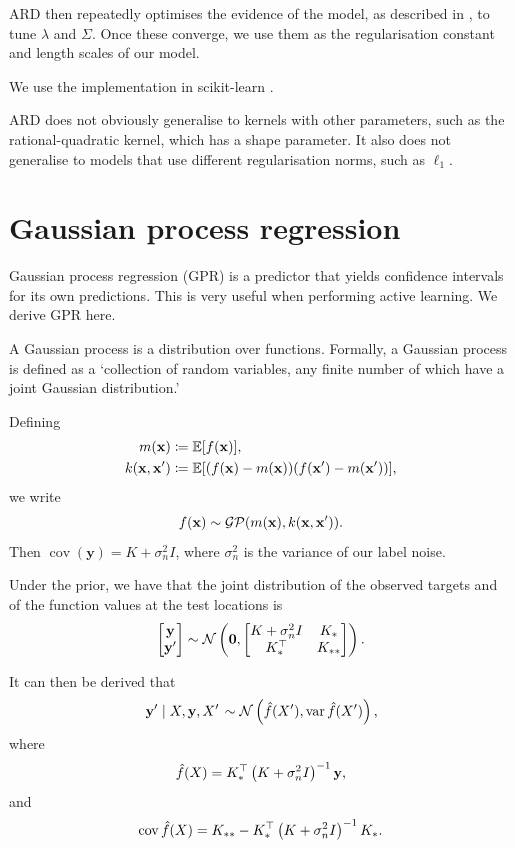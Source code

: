 \documentclass[11pt,twoside,openright]{report}
\newcommand\bbE{\mathbb{E}}
\newcommand\bx{\mathbf{x}}
\newcommand\by{\mathbf{y}}
\newcommand\cG{\mathcal{G}}
\newcommand\cN{\mathcal{N}}
\newcommand\cP{\mathcal{P}}
\DeclareMathOperator{\var}{var}
\DeclareMathOperator{\cov}{cov}
\begin{document}
ARD then repeatedly optimises the evidence of the model, as described in \citep{ARD}, to tune $\lambda$ and $\Sigma$. Once these converge, we use them as the regularisation constant and length scales of our model.

We use the implementation in scikit-learn \citep{Sklearn}.

ARD does not obviously generalise to kernels with other parameters, such as the rational-quadratic kernel, which has a shape parameter. It also does not generalise to models that use different regularisation norms, such as $\ell_1$.

\section{Gaussian process regression}
Gaussian process regression (GPR) is a predictor that yields confidence intervals for its own predictions. This is very useful when performing active learning. We derive GPR here.

A Gaussian process is a distribution over functions. Formally, a Gaussian process is defined as a `collection of random variables, any finite number of which have a joint Gaussian distribution.'\citep{GPBook}

Defining \begin{align*}
    m(\bx) &\coloneqq \bbE[f(\bx)] \text, \\
    k(\bx, \bx') &\coloneqq \bbE[(f(\bx) - m(\bx))(f(\bx') - m(\bx'))],
\end{align*} we write \[
    f(\bx) \sim \cG\cP(m(\bx), k(\bx, \bx'))\text.
\] Then $\cov(\by) = K + \sigma_n^2 I$, where $\sigma_n^2$ is the variance of our label noise.

Under the prior, we have that the joint distribution of the observed targets and of the function values at the test locations is \[
    \begin{bmatrix}
        \by \\ \by'
    \end{bmatrix} \sim \cN\left(\mathbf{0}, \begin{bmatrix}
        K + \sigma_n^2I & K_* \\
        K_*^\top & K_{**}
    \end{bmatrix}\right)\text.
\]

It can then be derived that \[
    \left. \by' \;\middle|\; X, \by, X' \right. \sim \cN\left(\hat f(X'), \var \hat f(X')\right)\text,
\] where \[
    \hat f(X) = K_*^\top\left(K + \sigma_n^2I\right)^{-1}\by\text,
\] and \[
    \cov\hat f(X) = K_{**} - K_*^\top\left(K + \sigma_n^2I\right)^{-1}K_*\text.
\]
\end{document}
